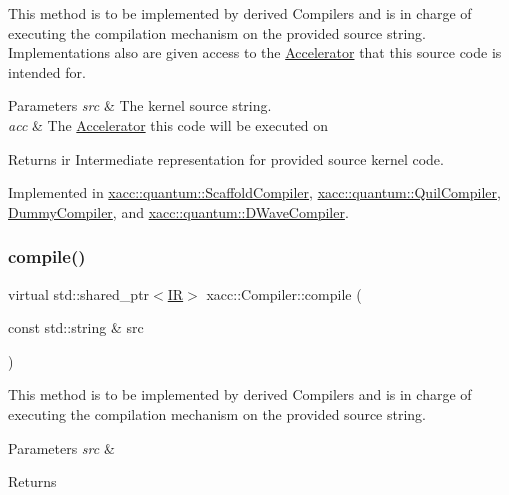 This method is to be implemented by derived Compilers and is in charge of executing the compilation mechanism on the provided source string. Implementations also are given access to the \hyperlink{a01084}{Accelerator} that this source code is intended for.


\begin{DoxyParams}{Parameters}
{\em src} & The kernel source string. \\
\hline
{\em acc} & The \hyperlink{a01084}{Accelerator} this code will be executed on \\
\hline
\end{DoxyParams}
\begin{DoxyReturn}{Returns}
ir Intermediate representation for provided source kernel code. 
\end{DoxyReturn}


Implemented in \hyperlink{a00936_a7caede75bb2304ba405966651b115543}{xacc\+::quantum\+::\+Scaffold\+Compiler}, \hyperlink{a00908_a2421482415ca4e09963ea4ecddff8100}{xacc\+::quantum\+::\+Quil\+Compiler}, \hyperlink{a00972_a9eaa6e6a4ff3645915d166a325bfde8d}{Dummy\+Compiler}, and \hyperlink{a00948_a0f7f6b10b4a881cb27b36eaa6d39e7b1}{xacc\+::quantum\+::\+D\+Wave\+Compiler}.

\mbox{\label{a01100_a9092f5f779b570c91569b59621280c04}} 
\subsubsection{\texorpdfstring{compile()}{compile()}\hspace{0.1cm}{\footnotesize\ttfamily [2/2]}}
{\footnotesize\ttfamily virtual std\+::shared\+\_\+ptr$<$\hyperlink{a01148}{IR}$>$ xacc\+::\+Compiler\+::compile (\begin{DoxyParamCaption}\item[{const std\+::string \&}]{src }\end{DoxyParamCaption})\hspace{0.3cm}{\ttfamily [pure virtual]}}

This method is to be implemented by derived Compilers and is in charge of executing the compilation mechanism on the provided source string. 
\begin{DoxyParams}{Parameters}
{\em src} & \\
\hline
\end{DoxyParams}
\begin{DoxyReturn}{Returns}

\end{DoxyReturn}


